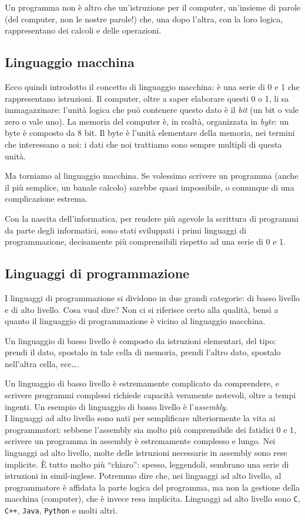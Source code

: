 Un programma non è altro che un'istruzione per il computer, un'insieme di parole (del computer, non le nostre parole!) che, una dopo l'altra, con la loro logica, rappresentano dei calcoli e delle operazioni.
\subsection{Linguaggio macchina}
Ecco quindi introdotto il concetto di linguaggio macchina: è una serie di 0 e 1 che rappresentano istruzioni. Il computer, oltre a saper elaborare questi 0 o 1, li sa immagazzinare: l'unità logica che può contenere questo dato è il \emph{bit} (un bit o vale zero o vale uno). La memoria del computer è, in realtà, organizzata in \emph{byte}: un byte è composto da 8 bit. Il byte è l'unità elementare della memoria, nei termini che interessano a noi: i dati che noi trattiamo sono sempre multipli di questa unità.

Ma torniamo al linguaggio macchina.  Se volessimo scrivere un programma (anche il più semplice, un banale calcolo) sarebbe quasi impossibile, o comunque di una complicazione estrema. 

Con la nascita dell'informatica, per rendere più agevole la scrittura di programmi da parte degli informatici, sono stati sviluppati i primi linguaggi di programmazione, decisamente più comprensibili rispetto ad una serie di 0 e 1.

\subsection{Linguaggi di programmazione}
I linguaggi di programmazione si dividono in due grandi categorie: di basso livello e di alto livello. Cosa vuol dire? Non ci si riferisce certo alla qualità, bensì a quanto il linguaggio di programmazione è vicino al linguaggio macchina. 

Un linguaggio di basso livello è composto da istruzioni elementari, del tipo: prendi il dato, spostalo in tale cella di memoria, prendi l'altro dato, spostalo nell'altra cella, ecc\ldots. 

Un linguaggio di basso livello è estremamente complicato da comprendere, e scrivere programmi complessi richiede capacità veramente notevoli, oltre a tempi ingenti. Un esempio di linguaggio di basso livello è l'\emph{assembly}.\\

I linguaggi ad alto livello sono nati per semplificare ulteriormente la vita ai programmatori: sebbene l'assembly sia molto più comprensibile dei fatidici 0 e 1, scrivere un programma in assembly è estremamente complesso e lungo. Nei linguaggi ad alto livello, molte delle istruzioni necessarie in assembly sono rese implicite. \`E tutto molto più ``chiaro'': spesso, leggendoli, sembrano una serie di istruzioni in simil-inglese. Potremmo dire che, nei linguaggi ad alto livello, al programmatore è affidata la parte logica del programma, ma non la gestione della macchina (computer), che è invece resa implicita. Linguaggi ad alto livello sono \verb|C|, \verb|C++|, \verb|Java|, \verb|Python| e molti altri.

